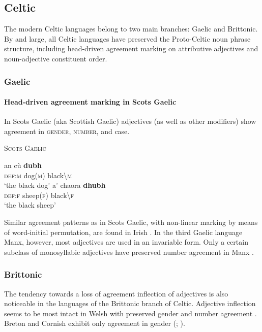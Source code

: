 \subsection{Celtic}
The modern Celtic languages belong to two main branches: Gaelic and Brittonic. By and large, all Celtic languages have preserved the Proto-Celtic noun phrase structure, including head-driven agreement marking on attributive adjectives and noun-adjective constituent order.

\subsubsection{Gaelic}
\paragraph{Head-driven agreement marking in Scots Gaelic} 
In Scots Gaelic (aka Scottish Gaelic) adjectives (as well as other modifiers) show agreement in \textsc{gender, number}, and {\sc case}.
\begin{exe}
\ex \textsc{Scots Gaelic} \cite[201]{macauley1992}
\begin{xlist}
\ex
\gll	an cù \textbf{dubh}\\
	\textsc{def:m} dog(\textsc{m}) black\textbackslash\textsc{m}\\
\glt	‘the black dog’
\ex
\gll	a' chaora \textbf{dhubh}\\
	\textsc{def:f} sheep(\textsc{f}) black\textbackslash\textsc{f}\\
\glt	‘the black sheep’
\end{xlist}
\end{exe}
Similar agreement patterns as in Scots Gaelic, with non-linear marking by means of word-initial permutation, are found in Irish \cite[73, 97]{odochartaigh1992}. In the third Gaelic language Manx, however, most adjectives are used in an invariable form. Only a certain subclass of monosyllabic adjectives have preserved number agreement in Manx \cite[127]{thomsen1992}.

\subsubsection{Brittonic}
The tendency towards a loss of agreement inflection of adjectives is also noticeable in the languages of the Brittonic branch of Celtic. Adjective inflection seems to be most intact in Welsh with preserved gender and number agreement \cite[298–299]{thomas1992a}. Breton and Cornish exhibit only agreement in gender (\citealt[405]{ternes1992}; \citealt[355]{thomas1992b}).

